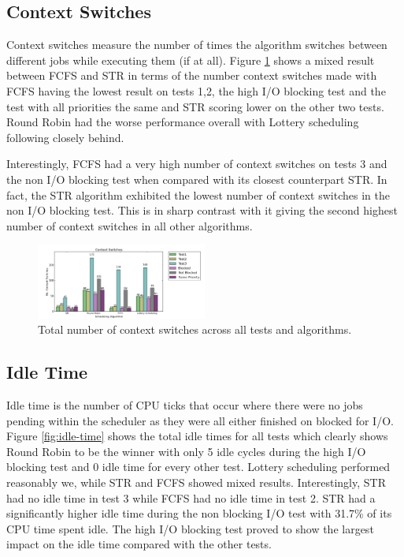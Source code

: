\documentclass{acm_proc_article-sp}
\begin{document}
\subsection{Context Switches}
Context switches measure the number of times the algorithm switches between different jobs while executing them (if at all). Figure \ref{fig:ctex-switches} shows a mixed result between FCFS and STR in terms of the number context switches made with FCFS having the lowest result on tests 1,2, the high I/O blocking test and the test with all priorities the same and STR scoring lower on the other two tests. Round Robin had the worse performance overall with Lottery scheduling following closely behind. 

Interestingly, FCFS had a very high number of context switches on tests 3 and the non I/O blocking test when compared with its closest counterpart STR. In fact, the STR algorithm exhibited the lowest number of context switches in the non I/O blocking test. This is in sharp contrast with it giving the second highest number of context switches in all other algorithms.

\begin{figure}[H]
\centering
\includegraphics[width=0.5\textwidth]{ctex_switches.png}
\caption{Total number of context switches across all tests and algorithms.}
\label{fig:ctex-switches}
\end{figure}

\subsection{Idle Time}
Idle time is the number of CPU ticks that occur where there were no jobs pending within the scheduler as they were all either finished on blocked for I/O. Figure \ref{fig:idle-time} shows the total idle times for all tests which clearly shows Round Robin to be the winner with only 5 idle cycles during the high I/O blocking test and 0 idle time for every other test. Lottery scheduling performed reasonably we, while STR and FCFS showed mixed results. Interestingly, STR had no idle time in test 3 while FCFS had no idle time in test 2. STR had a significantly higher idle time during the non blocking I/O test with 31.7\% of its CPU time spent idle. The high I/O blocking test proved to show the largest impact on the idle time compared with the other tests.
\end{document}
